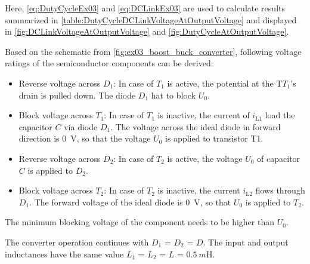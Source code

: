 \begin{solutionblock}
    Here, \eqref{eq:DutyCycleEx03} and \eqref{eq:DCLinkEx03} are used to calculate results summarized in \autoref{table:DutyCycleDCLinkVoltageAtOutputVoltage} 
    and displayed in \autoref{fig:DCLinkVoltageAtOutputVoltage} and \autoref{fig:DutyCycleAtOutputVoltage}.

    
    
    

\end{solutionblock}


\begin{solutionblock}
    Based on the schematic from \autoref{fig:ex03_boost_buck_converter}, following voltage ratings of the semiconductor components can be derived:
    \begin{itemize}
        \item Reverse voltage across $D_1$: In case of $T_1$ is active, the potential at the T$T_1$'s drain is pulled down. 
              The diode $D_1$ hat to block $U_0$.
        \item Block voltage across $T_1$: In case of $T_1$ is inactive, the current of $i_\mathrm{L1}$ load the capacitor $C$ via diode $D_1$. 
              The voltage across the ideal diode in forward direction is \SI{0}{\volt}, so that the voltage $U_0$ is applied to transistor T1.
        \item Reverse voltage across $D_2$: In case of $T_2$ is active, the voltage $U_0$ of capacitor $C$ is applied to $D_2$.
        \item Block voltage across $T_2$: In case of $T_2$ is inactive, the current $i_\mathrm{L2}$ flows through $D_1$. 
              The forward voltage of the ideal diode is \SI{0}{\volt}, so that $U_0$ is applied to $T_2$.
    \end{itemize}     
    The minimum blocking voltage of the component needs to be higher than $U_\mathrm{0}$.
\end{solutionblock}

\vspace{2em}\par
The converter operation continues with $D_\mathrm{1}$ = $D_\mathrm{2}$ = $D$. The input and output inductances 
have the same value $L_\mathrm{1}$ = $L_\mathrm{2}$ = $L$ = $\SI{0.5}{m\henry}$.

